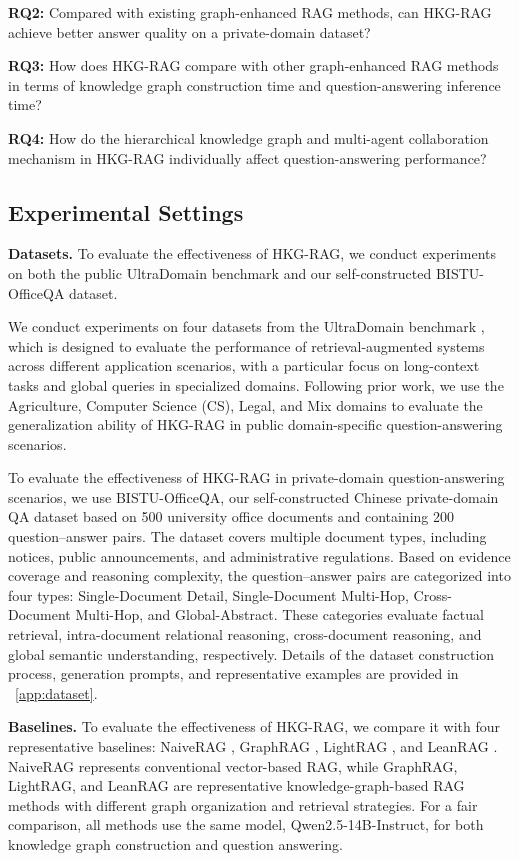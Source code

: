 \documentclass[preprint,12pt,authoryear]{elsarticle}
\begin{document}
\textbf{RQ2:} Compared with existing graph-enhanced RAG methods, can HKG-RAG achieve better answer quality on a private-domain dataset?

\textbf{RQ3:} How does HKG-RAG compare with other graph-enhanced RAG methods in terms of knowledge graph construction time and question-answering inference time?

\textbf{RQ4:} How do the hierarchical knowledge graph and multi-agent collaboration mechanism in HKG-RAG individually affect question-answering performance?
%
\subsection{Experimental Settings}
\label{subsec:experimental-setup}
\textbf{Datasets.}
To evaluate the effectiveness of HKG-RAG, we conduct experiments on both the public UltraDomain benchmark and our self-constructed BISTU-OfficeQA dataset.

We conduct experiments on four datasets from the UltraDomain benchmark \citep{qian2025memorag}, which is designed to evaluate the performance of retrieval-augmented systems across different application scenarios, with a particular focus on long-context tasks and global queries in specialized domains. Following prior work, we use the Agriculture, Computer Science (CS), Legal, and Mix domains to evaluate the generalization ability of HKG-RAG in public domain-specific question-answering scenarios.

To evaluate the effectiveness of HKG-RAG in private-domain question-answering scenarios, we use BISTU-OfficeQA, our self-constructed Chinese private-domain QA dataset based on 500 university office documents and containing 200 question--answer pairs. The dataset covers multiple document types, including notices, public announcements, and administrative regulations. Based on evidence coverage and reasoning complexity, the question--answer pairs are categorized into four types: Single-Document Detail, Single-Document Multi-Hop, Cross-Document Multi-Hop, and Global-Abstract. These categories evaluate factual retrieval, intra-document relational reasoning, cross-document reasoning, and global semantic understanding, respectively. Details of the dataset construction process, generation prompts, and representative examples are provided in ~\ref{app:dataset}.
%

\textbf{Baselines.}
To evaluate the effectiveness of HKG-RAG, we compare it with four representative baselines: NaiveRAG \citep{lewis2020retrieval}, GraphRAG \citep{edge2024graphrag}, LightRAG \citep{guo2025lightrag}, and LeanRAG \citep{zhang2026leanrag}. NaiveRAG represents conventional vector-based RAG, while GraphRAG, LightRAG, and LeanRAG are representative knowledge-graph-based RAG methods with different graph organization and retrieval strategies. For a fair comparison, all methods use the same model, Qwen2.5-14B-Instruct, for both knowledge graph construction and question answering.
\end{document}
